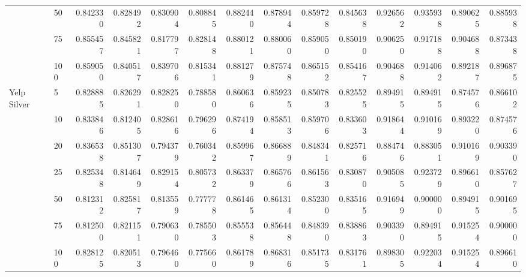 \begin{tabular}{llrrrrrrrrrrrr}
               & 50  &        0.842330 &     0.828492 &  0.830904 &  0.808845 &        0.882440 &     0.878944 &  0.859728 &  0.845638 &        0.926562 &     0.935938 &  0.890625 &  0.885938 \\
               & 75  &        0.855457 &     0.845821 &  0.817797 &  0.828148 &        0.880121 &     0.880060 &  0.859050 &  0.850190 &        0.906250 &     0.917188 &  0.904688 &  0.873438 \\
               & 100 &        0.859050 &     0.840517 &  0.839706 &  0.815341 &        0.881279 &     0.875748 &  0.865152 &  0.854167 &        0.904688 &     0.914062 &  0.892187 &  0.896875 \\
Yelp Silver & 5   &        0.828885 &     0.826291 &  0.828250 &  0.788580 &        0.860636 &     0.859235 &  0.850783 &  0.825525 &        0.894915 &     0.894915 &  0.874576 &  0.866102 \\
               & 10  &        0.833846 &     0.812405 &  0.828616 &  0.796296 &        0.874194 &     0.858513 &  0.859706 &  0.833603 &        0.918644 &     0.910169 &  0.893220 &  0.874576 \\
               & 20  &        0.836538 &     0.851307 &  0.794379 &  0.760342 &        0.859967 &     0.866889 &  0.848341 &  0.825716 &        0.884746 &     0.883051 &  0.910169 &  0.903390 \\
               & 25  &        0.825348 &     0.814649 &  0.829154 &  0.805732 &        0.863379 &     0.865766 &  0.861563 &  0.830870 &        0.905085 &     0.923729 &  0.896610 &  0.857627 \\
               & 50  &        0.812312 &     0.825817 &  0.813559 &  0.777778 &        0.861465 &     0.861314 &  0.852300 &  0.835165 &        0.916949 &     0.900000 &  0.894915 &  0.901695 \\
               & 75  &        0.812500 &     0.821151 &  0.790630 &  0.785503 &        0.855538 &     0.856448 &  0.848390 &  0.838863 &        0.903390 &     0.894915 &  0.915254 &  0.900000 \\
               & 100 &        0.828125 &     0.820513 &  0.796460 &  0.775660 &        0.861789 &     0.868316 &  0.851735 &  0.831761 &        0.898305 &     0.922034 &  0.915254 &  0.896610 \\
\bottomrule
\end{tabular}
